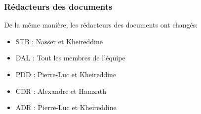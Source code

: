 \documentclass{../res/adr}
\begin{document}
    \subsubsection{Rédacteurs des documents}
        De la même manière, les rédacteurs des documents ont changés:
      \begin{itemize}
        \item STB : Nasser et Kheireddine
        \item DAL : Tout les membres de l'équipe
        \item PDD : Pierre-Luc et Kheireddine
        \item CDR : Alexandre et Hamzath
        \item ADR : Pierre-Luc et Kheireddine
      \end{itemize}

\newpage
\end{document}
